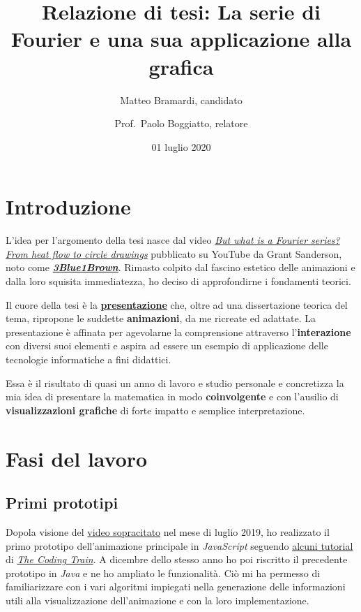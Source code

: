 \documentclass[
]{book}
\title{Relazione di tesi: La serie di Fourier e una sua applicazione alla grafica}
\author{Matteo Bramardi, candidato \and Prof.~Paolo Boggiatto, relatore}
\date{01 luglio 2020}
\begin{document}
\maketitle

{
\setcounter{tocdepth}{1}
\tableofcontents
}
\hypertarget{introduzione}{%
\chapter*{Introduzione}\label{introduzione}}

L'idea per l'argomento della tesi nasce dal video \href{https://www.youtube.com/watch?v=r6sGWTCMz2k}{\emph{But what is a Fourier series? From heat flow to circle drawings}} pubblicato su YouTube da Grant Sanderson, noto come \href{https://www.youtube.com/c/3blue1brown}{\emph{\textbf{3Blue1Brown}}}. Rimasto colpito dal fascino estetico delle animazioni e dalla loro squisita immediatezza, ho deciso di approfondirne i fondamenti teorici.

Il cuore della tesi è la \href{https://bradwave.github.io/thesis}{\textbf{presentazione}} che, oltre ad una dissertazione teorica del tema, ripropone le suddette \textbf{animazioni}, da me ricreate ed adattate. La presentazione è affinata per agevolarne la comprensione attraverso l'\textbf{interazione} con diversi suoi elementi e aspira ad essere un esempio di applicazione delle tecnologie informatiche a fini didattici.

Essa è il risultato di quasi un anno di lavoro e studio personale e concretizza la mia idea di presentare la matematica in modo \textbf{coinvolgente} e con l'ausilio di \textbf{visualizzazioni grafiche} di forte impatto e semplice interpretazione.

\hypertarget{lavoro}{%
\chapter{Fasi del lavoro}\label{lavoro}}

\hypertarget{prototipi}{%
\section{Primi prototipi}\label{prototipi}}

Dopola visione del \href{https://www.youtube.com/watch?v=r6sGWTCMz2k}{video sopracitato} nel mese di luglio 2019, ho realizzato il primo prototipo dell'animazione principale in \emph{JavaScript} seguendo \href{https://www.youtube.com/watch?v=MY4luNgGfms}{alcuni tutorial} di \href{https://www.youtube.com/thecodingtrain}{\emph{The Coding Train}}. A dicembre dello stesso anno ho poi riscritto il precedente prototipo in \emph{Java} e ne ho ampliato le funzionalità. Ciò mi ha permesso di familiarizzare con i vari algoritmi impiegati nella generazione delle informazioni utili alla visualizzazione dell'animazione e con la loro implementazione.
\end{document}
